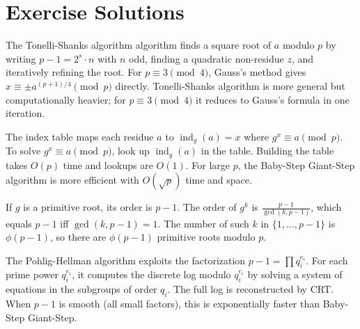 \section{Exercise Solutions}

\begin{solution}
The Tonelli-Shanks algorithm algorithm finds a square root of $a$ modulo $p$ by writing $p-1 = 2^s \cdot n$ with $n$ odd, finding a quadratic non-residue $z$, and iteratively refining the root. For $p \equiv 3 \pmod{4}$, Gauss's method gives $x \equiv \pm a^{(p+1)/4} \pmod{p}$ directly. Tonelli-Shanks algorithm is more general but computationally heavier; for $p \equiv 3 \pmod{4}$ it reduces to Gauss's formula in one iteration.
\end{solution}

\begin{solution}
The index table maps each residue $a$ to $\operatorname{ind}_g(a) = x$ where $g^x \equiv a \pmod{p}$. To solve $g^x \equiv a \pmod{p}$, look up $\operatorname{ind}_g(a)$ in the table. Building the table takes $O(p)$ time and lookups are $O(1)$. For large $p$, the Baby-Step Giant-Step algorithm is more efficient with $O(\sqrt{p})$ time and space.
\end{solution}

\begin{solution}
If $g$ is a primitive root, its order is $p-1$. The order of $g^k$ is $\frac{p-1}{\gcd(k, p-1)}$, which equals $p-1$ iff $\gcd(k, p-1) = 1$. The number of such $k$ in $\{1, \ldots, p-1\}$ is $\phi(p-1)$, so there are $\phi(p-1)$ primitive roots modulo $p$.
\end{solution}

\begin{solution}
The Pohlig-Hellman algorithm exploits the factorization $p-1 = \prod q_i^{e_i}$. For each prime power $q_i^{e_i}$, it computes the discrete log modulo $q_i^{e_i}$ by solving a system of equations in the subgroups of order $q_i$. The full log is reconstructed by CRT. When $p-1$ is smooth (all small factors), this is exponentially faster than Baby-Step Giant-Step.
\end{solution}

